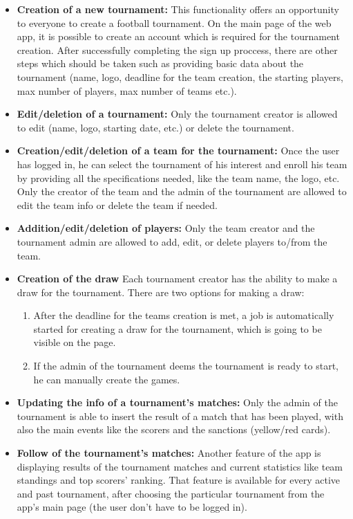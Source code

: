 \begin{itemize}
    \item \textbf{Creation of a new tournament:}
        This functionality offers an opportunity to everyone to create a football tournament. On the main page of the web app, it is possible to create an account which is required for the tournament creation. After successfully completing the sign up proccess, there are other steps which should be taken such as providing basic data about the tournament (name, logo, deadline for the team creation, the starting players, max number of players, max number of teams etc.).
        
        \item \textbf{Edit/deletion of a tournament:}
        Only the tournament creator is allowed to edit (name, logo, starting date, etc.) or delete the tournament.
        
    \item \textbf{Creation/edit/deletion of a team for the tournament:}
        Once the user has logged in, he can select the tournament of his interest and enroll his team by providing all the specifications needed, like the team name, the logo, etc. Only the creator of the team and the admin of the tournament are allowed to edit the team info or delete the team if needed.
        
    \item \textbf{Addition/edit/deletion of players:}
        Only the team creator and the tournament admin are allowed to add, edit, or delete players to/from the team.

    \item \textbf{Creation of the draw}
        Each tournament creator has the ability to make a draw for the tournament. There are two options for making a draw: 
        \begin{enumerate}
            \item After the deadline for the teams creation is met, a job is automatically started for creating a draw for the tournament, which is going to be visible on the page.
            \item If the admin of the tournament deems the tournament is ready to start, he can manually create the games.
        \end{enumerate}
        
    \item \textbf{Updating the info of a tournament's matches:}
        Only the admin of the tournament is able to insert the result of a match that has been played, with also the main events like the scorers and the sanctions (yellow/red cards).
        
    \item \textbf{Follow of the tournament's matches:}
        Another feature of the app is displaying results of the tournament matches and current statistics like team standings and top scorers' ranking. That feature is available for every active and past tournament, after choosing the particular tournament from the app's main page (the user don't have to be logged in).

\end{itemize}

